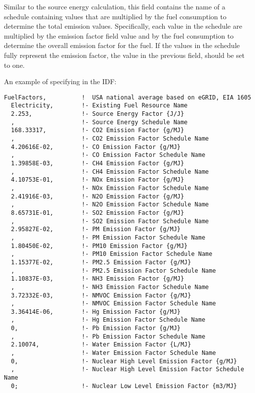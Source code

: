 Similar to the source energy calculation, this field contains the name of a schedule containing values that are multiplied by the fuel consumption to determine the total emission values. Specifically, each value in the schedule are multiplied by the emission factor field value and by the fuel consumption to determine the overall emission factor for the fuel. If the values in the schedule fully represent the emission factor, the value in the previous field, should be set to one.

An example of specifying in the IDF:

\begin{lstlisting}
FuelFactors,          !  USA national average based on eGRID, EIA 1605
  Electricity,        !- Existing Fuel Resource Name
  2.253,              !- Source Energy Factor {J/J}
  ,                   !- Source Energy Schedule Name
  168.33317,          !- CO2 Emission Factor {g/MJ}
  ,                   !- CO2 Emission Factor Schedule Name
  4.20616E-02,        !- CO Emission Factor {g/MJ}
  ,                   !- CO Emission Factor Schedule Name
  1.39858E-03,        !- CH4 Emission Factor {g/MJ}
  ,                   !- CH4 Emission Factor Schedule Name
  4.10753E-01,        !- NOx Emission Factor {g/MJ}
  ,                   !- NOx Emission Factor Schedule Name
  2.41916E-03,        !- N2O Emission Factor {g/MJ}
  ,                   !- N2O Emission Factor Schedule Name
  8.65731E-01,        !- SO2 Emission Factor {g/MJ}
  ,                   !- SO2 Emission Factor Schedule Name
  2.95827E-02,        !- PM Emission Factor {g/MJ}
  ,                   !- PM Emission Factor Schedule Name
  1.80450E-02,        !- PM10 Emission Factor {g/MJ}
  ,                   !- PM10 Emission Factor Schedule Name
  1.15377E-02,        !- PM2.5 Emission Factor {g/MJ}
  ,                   !- PM2.5 Emission Factor Schedule Name
  1.10837E-03,        !- NH3 Emission Factor {g/MJ}
  ,                   !- NH3 Emission Factor Schedule Name
  3.72332E-03,        !- NMVOC Emission Factor {g/MJ}
  ,                   !- NMVOC Emission Factor Schedule Name
  3.36414E-06,        !- Hg Emission Factor {g/MJ}
  ,                   !- Hg Emission Factor Schedule Name
  0,                  !- Pb Emission Factor {g/MJ}
  ,                   !- Pb Emission Factor Schedule Name
  2.10074,            !- Water Emission Factor {L/MJ}
  ,                   !- Water Emission Factor Schedule Name
  0,                  !- Nuclear High Level Emission Factor {g/MJ}
  ,                   !- Nuclear High Level Emission Factor Schedule Name
  0;                  !- Nuclear Low Level Emission Factor {m3/MJ}
\end{lstlisting}

